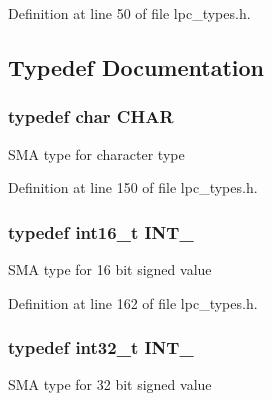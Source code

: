 Definition at line 50 of file lpc\+\_\+types.\+h.



\subsection{Typedef Documentation}
\subsubsection[{\texorpdfstring{C\+H\+AR}{CHAR}}]{\setlength{\rightskip}{0pt plus 5cm}typedef char {\bf C\+H\+AR}}\hypertarget{group___l_p_c___types___public___types_gaebb9e13210d88d43e32e735ada43a425}{}\label{group___l_p_c___types___public___types_gaebb9e13210d88d43e32e735ada43a425}
S\+MA type for character type 

Definition at line 150 of file lpc\+\_\+types.\+h.

\subsubsection[{\texorpdfstring{I\+N\+T\+\_\+16}{INT_16}}]{\setlength{\rightskip}{0pt plus 5cm}typedef {\bf int16\+\_\+t} {\bf I\+N\+T\+\_}}\hypertarget{group___l_p_c___types___public___types_gaae6e34a91bf60db05de64de7720df9a5}{}\label{group___l_p_c___types___public___types_gaae6e34a91bf60db05de64de7720df9a5}
S\+MA type for 16 bit signed value 

Definition at line 162 of file lpc\+\_\+types.\+h.

\subsubsection[{\texorpdfstring{I\+N\+T\+\_\+32}{INT_32}}]{\setlength{\rightskip}{0pt plus 5cm}typedef {\bf int32\+\_\+t} {\bf I\+N\+T\+\_}}\hypertarget{group___l_p_c___types___public___types_ga3a17614f3a1b67eaf20781d8ec16a652}{}\label{group___l_p_c___types___public___types_ga3a17614f3a1b67eaf20781d8ec16a652}
S\+MA type for 32 bit signed value 

